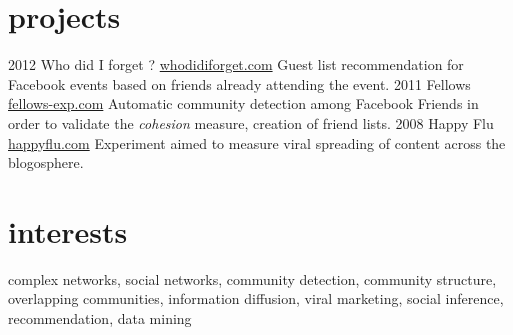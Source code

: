 \documentclass[]{friggeri-cv}
\begin{document}
\section{projects}

\begin{entrylist}
    \entry
    {2012}
    {Who did I forget ?}
    {\href{http://whodidiforget.com}{whodidiforget.com}}
    {Guest list recommendation for Facebook events based on friends already attending the event.}
    \entry
    {2011}
    {Fellows}
    {\href{http://fellows-exp.com}{fellows-exp.com}}
    {Automatic community detection among Facebook Friends in order to validate the \emph{cohesion} measure, creation of friend lists.}
    \entry
    {2008}
    {Happy Flu}
    {\href{http://happyflu.com}{happyflu.com}}
    {Experiment aimed to measure viral spreading of content across the blogosphere.}
\end{entrylist}

\section{interests}

complex networks, social networks, community detection, community structure,
overlapping communities, information diffusion, viral marketing, social
inference, recommendation, data mining
\end{document}
